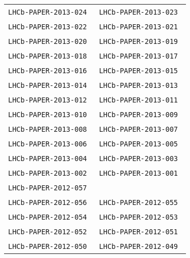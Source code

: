 \begin{center}
\begin{longtable}{ll}
\texttt{LHCb-PAPER-2013-024}~\cite{LHCb-PAPER-2013-024} &
\texttt{LHCb-PAPER-2013-023}~\cite{LHCb-PAPER-2013-023} \\
\texttt{LHCb-PAPER-2013-022}~\cite{LHCb-PAPER-2013-022} &
\texttt{LHCb-PAPER-2013-021}~\cite{LHCb-PAPER-2013-021} \\
\texttt{LHCb-PAPER-2013-020}~\cite{LHCb-PAPER-2013-020} &
\texttt{LHCb-PAPER-2013-019}~\cite{LHCb-PAPER-2013-019} \\
\texttt{LHCb-PAPER-2013-018}~\cite{LHCb-PAPER-2013-018} &
\texttt{LHCb-PAPER-2013-017}~\cite{LHCb-PAPER-2013-017} \\
\texttt{LHCb-PAPER-2013-016}~\cite{LHCb-PAPER-2013-016} &
\texttt{LHCb-PAPER-2013-015}~\cite{LHCb-PAPER-2013-015} \\
\texttt{LHCb-PAPER-2013-014}~\cite{LHCb-PAPER-2013-014} &
\texttt{LHCb-PAPER-2013-013}~\cite{LHCb-PAPER-2013-013} \\
\texttt{LHCb-PAPER-2013-012}~\cite{LHCb-PAPER-2013-012} &
\texttt{LHCb-PAPER-2013-011}~\cite{LHCb-PAPER-2013-011} \\
\texttt{LHCb-PAPER-2013-010}~\cite{LHCb-PAPER-2013-010} &
\texttt{LHCb-PAPER-2013-009}~\cite{LHCb-PAPER-2013-009} \\
\texttt{LHCb-PAPER-2013-008}~\cite{LHCb-PAPER-2013-008} &
\texttt{LHCb-PAPER-2013-007}~\cite{LHCb-PAPER-2013-007} \\
\texttt{LHCb-PAPER-2013-006}~\cite{LHCb-PAPER-2013-006} &
\texttt{LHCb-PAPER-2013-005}~\cite{LHCb-PAPER-2013-005} \\
\texttt{LHCb-PAPER-2013-004}~\cite{LHCb-PAPER-2013-004} &
\texttt{LHCb-PAPER-2013-003}~\cite{LHCb-PAPER-2013-003} \\
\texttt{LHCb-PAPER-2013-002}~\cite{LHCb-PAPER-2013-002} &
\texttt{LHCb-PAPER-2013-001}~\cite{LHCb-PAPER-2013-001} \\
\hline
\texttt{LHCb-PAPER-2012-057}~\cite{LHCb-PAPER-2012-057} \\
\texttt{LHCb-PAPER-2012-056}~\cite{LHCb-PAPER-2012-056} & 
\texttt{LHCb-PAPER-2012-055}~\cite{LHCb-PAPER-2012-055} \\
\texttt{LHCb-PAPER-2012-054}~\cite{LHCb-PAPER-2012-054} & 
\texttt{LHCb-PAPER-2012-053}~\cite{LHCb-PAPER-2012-053} \\
\texttt{LHCb-PAPER-2012-052}~\cite{LHCb-PAPER-2012-052} & 
\texttt{LHCb-PAPER-2012-051}~\cite{LHCb-PAPER-2012-051} \\
\texttt{LHCb-PAPER-2012-050}~\cite{LHCb-PAPER-2012-050} & 
\texttt{LHCb-PAPER-2012-049}~\cite{LHCb-PAPER-2012-049} \\

\end{longtable}
\end{center}
